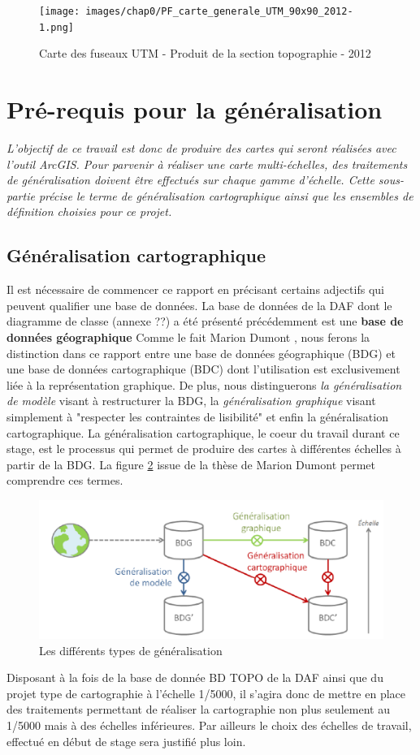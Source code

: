 \begin{figure}[ht]
\centering
\texttt{[image: images/chap0/PF\_carte\_generale\_UTM\_90x90\_2012-1.png]}
\caption{Carte des fuseaux UTM - Produit de la section topographie - 2012}
\label{fuseauUTM}
\end{figure}

\section{Pré-requis pour la généralisation }
\textit{L'objectif de ce travail est donc de produire des cartes qui seront réalisées avec l'outil ArcGIS. Pour parvenir à réaliser une carte multi-échelles, des traitements de généralisation doivent être effectués sur chaque gamme d'échelle. Cette sous-partie précise le terme de généralisation cartographique ainsi que les ensembles de définition choisies pour ce projet.}
\subsection{Généralisation cartographique}
Il est nécessaire de commencer ce rapport en précisant certains adjectifs qui peuvent qualifier une base de données. La base de données de la DAF dont le diagramme de classe (annexe ??) a été présenté précédemment est une \textbf{base de données géographique} Comme le fait Marion Dumont \cite{Dumont2018}, nous ferons la distinction dans ce rapport entre une base de données géographique (BDG) et une base de données cartographique (BDC) dont l'utilisation est exclusivement liée à la représentation graphique. De plus, nous distinguerons \textit{la généralisation de modèle} visant à restructurer la BDG, la \textit{généralisation graphique} visant simplement à "respecter les contraintes de lisibilité" et enfin la généralisation cartographique. La généralisation cartographique, le coeur du travail durant ce stage, est le processus qui permet de produire des cartes à différentes échelles à partir de la BDG. La figure \ref{dumont} issue de la thèse de Marion Dumont permet comprendre ces termes.

\begin{figure}[ht]
\centering
\includegraphics[width=\linewidth]{images/chap1/generalisation_dumont.png}
\caption{Les différents types de généralisation}
\label{dumont}
\end{figure}
Disposant à la fois de la base de donnée BD TOPO de la DAF ainsi que du projet type de cartographie à l'échelle 1/5000, il s'agira donc de mettre en place des traitements permettant de réaliser la cartographie non plus seulement au 1/5000 mais à des échelles inférieures. Par ailleurs le choix des échelles de travail, effectué en début de stage sera justifié plus loin.

